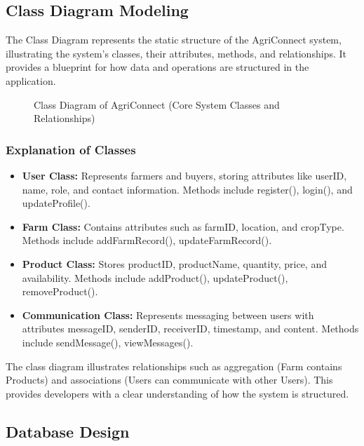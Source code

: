 \documentclass[12pt,a4paper]{article}
\begin{document}
\subsection{Class Diagram Modeling}

The Class Diagram represents the static structure of the AgriConnect system, illustrating the system’s classes, their attributes, methods, and relationships. It provides a blueprint for how data and operations are structured in the application.

\begin{figure}[H]
\centering
{}
\caption{Class Diagram of AgriConnect (Core System Classes and Relationships)}
\end{figure}

\subsubsection{Explanation of Classes}

\begin{itemize}
    \item \textbf{User Class:} Represents farmers and buyers, storing attributes like userID, name, role, and contact information. Methods include register(), login(), and updateProfile().
    \item \textbf{Farm Class:} Contains attributes such as farmID, location, and cropType. Methods include addFarmRecord(), updateFarmRecord().
    \item \textbf{Product Class:} Stores productID, productName, quantity, price, and availability. Methods include addProduct(), updateProduct(), removeProduct().
    \item \textbf{Communication Class:} Represents messaging between users with attributes messageID, senderID, receiverID, timestamp, and content. Methods include sendMessage(), viewMessages().
\end{itemize}

The class diagram illustrates relationships such as aggregation (Farm contains Products) and associations (Users can communicate with other Users). This provides developers with a clear understanding of how the system is structured.

\subsection{Database Design}
\end{document}
